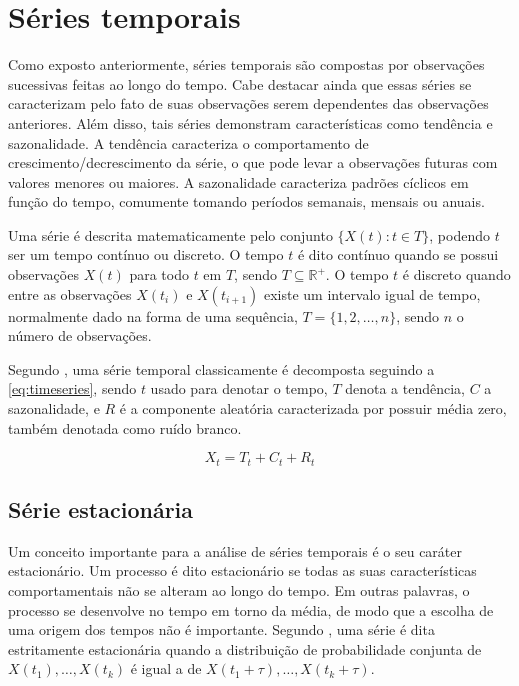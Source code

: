 \documentclass[
    12pt,
    oneside,
    a4paper,
    english,
    brazil
]{abntex2}
\begin{document}
\section{Séries temporais}\label{sec:seriesTemporais}

Como  exposto anteriormente,  séries  temporais são  compostas por  observações
sucessivas  feitas ao  longo do  tempo. Cabe  destacar ainda  que essas  séries
se  caracterizam   pelo  fato  de   suas  observações  serem   dependentes  das
observações  anteriores. Além  disso,  tais  séries demonstram  características
como  tendência e  sazonalidade.  A tendência  caracteriza  o comportamento  de
crescimento/decrescimento da série, o que  pode levar a observações futuras com
valores  menores ou  maiores. A  sazonalidade caracteriza  padrões cíclicos  em
função do tempo, comumente tomando períodos semanais, mensais ou anuais.

Uma série é descrita matematicamente pelo conjunto $\{X(t): t \in T\}$, podendo
$t$ ser  um tempo  contínuo ou  discreto. O  tempo $t$  é dito  contínuo quando
se  possui  observações  $X(t)$  para  todo $t$  em  $T$,  sendo  $T  \subseteq
\mathbb{R}^{+}$. O tempo $t$ é discreto  quando entre as observações $X(t_i)$ e
$X(t_{i+1})$ existe um  intervalo igual de tempo, normalmente dado  na forma de
uma sequência, $T = \{1, 2, \ldots, n\}$, sendo $n$ o número de observações.

Segundo  , uma  série  temporal  classicamente é  decomposta
seguindo a \autoref{eq:timeseries},  sendo $t$ usado para denotar  o tempo, $T$
denota  a  tendência, $C$  a  sazonalidade,  e  $R$  é a  componente  aleatória
caracterizada por possuir média zero, também denotada como ruído branco.

\begin{equation}
    \label{eq:timeseries}
    X_t = T_t + C_t + R_t
\end{equation}

\subsection{Série estacionária}

Um  conceito importante  para a  análise de  séries temporais  é o  seu caráter
estacionário. Um processo é dito  estacionário se todas as suas características
comportamentais  não se  alteram  ao  longo do  tempo.  Em  outras palavras,  o
processo se desenvolve no tempo em torno da média, de modo que a escolha de uma
origem dos  tempos não é  importante. Segundo , uma  série é
dita estritamente estacionária quando  a distribuição de probabilidade conjunta
de  $X(t_1), \ldots,  X(t_k)$ é  igual a  de $X(t_1  + \tau),  \ldots, X(t_k  +
\tau)$.
\end{document}
